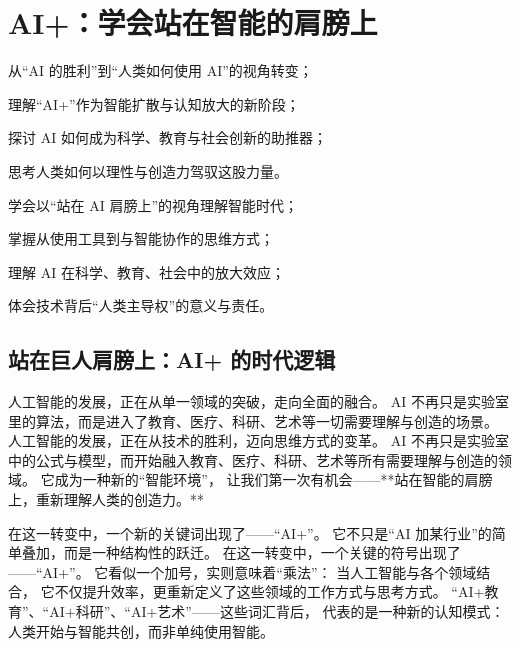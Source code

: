 \chapter{AI+：学会站在智能的肩膀上}

\begin{introduction}
  \item 从“AI 的胜利”到“人类如何使用 AI”的视角转变；
  \item 理解“AI+”作为智能扩散与认知放大的新阶段；
  \item 探讨 AI 如何成为科学、教育与社会创新的助推器；
  \item 思考人类如何以理性与创造力驾驭这股力量。
\end{introduction}

\begin{introduction}
  \item 学会以“站在 AI 肩膀上”的视角理解智能时代；
  \item 掌握从使用工具到与智能协作的思维方式；
  \item 理解 AI 在科学、教育、社会中的放大效应；
  \item 体会技术背后“人类主导权”的意义与责任。
\end{introduction}

\section{站在巨人肩膀上：AI+ 的时代逻辑}

人工智能的发展，正在从单一领域的突破，走向全面的融合。  
AI 不再只是实验室里的算法，而是进入了教育、医疗、科研、艺术等一切需要理解与创造的场景。  
人工智能的发展，正在从技术的胜利，迈向思维方式的变革。  
AI 不再只是实验室中的公式与模型，而开始融入教育、医疗、科研、艺术等所有需要理解与创造的领域。  
它成为一种新的“智能环境”，  
让我们第一次有机会——**站在智能的肩膀上，重新理解人类的创造力。**

在这一转变中，一个新的关键词出现了——“AI+”。  
它不只是“AI 加某行业”的简单叠加，而是一种结构性的跃迁。  
在这一转变中，一个关键的符号出现了——“AI+”。  
它看似一个加号，实则意味着“乘法”：  
当人工智能与各个领域结合，  
它不仅提升效率，更重新定义了这些领域的工作方式与思考方式。  
“AI+教育”、“AI+科研”、“AI+艺术”——这些词汇背后，  
代表的是一种新的认知模式：  
人类开始与智能共创，而非单纯使用智能。

